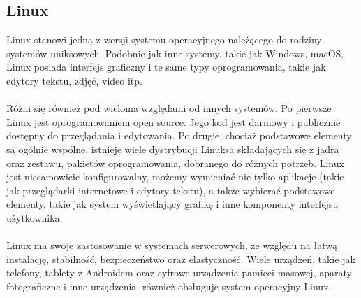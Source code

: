 \documentclass[10pt,a4paper]{report}
\begin{document}
\begin{adjustwidth}{2cm}{2cm}
\section{Linux}
\begin{minipage}{1\linewidth}
Linux stanowi jedną z wersji systemu operacyjnego należącego do rodziny systemów uniksowych.
Podobnie jak inne systemy, takie jak Windows, macOS, Linux posiada interfejs graficzny i te same typy oprogramowania, takie jak edytory tekstu, zdjęć, video itp. \\ \\
Różni się również pod wieloma względami od innych systemów. Po pierwsze Linux jest oprogramowaniem open source. Jego kod jest darmowy i publicznie dostępny do przeglądania i edytowania. Po drugie, chociaż podstawowe elementy są ogólnie wspólne, istnieje wiele dystrybucji Linuksa składających się z jądra oraz zestawu, pakietów oprogramowania, dobranego do różnych potrzeb. Linux jest niesamowicie konfigurowalny, możemy wymieniać nie tylko aplikacje (takie jak przeglądarki internetowe i edytory tekstu), a także wybierać podstawowe elementy, takie jak system wyświetlający grafikę i inne komponenty interfejsu użytkownika. \\ \\
Linux ma swoje zastosowanie w systemach serwerowych, ze względu na łatwą instalację, stabilność, bezpieczeństwo oraz elastyczność. Wiele urządzeń, takie jak telefony, tablety z Androidem oraz cyfrowe urządzenia pamięci masowej, aparaty fotograficzne i inne urządzenia, również obsługuje system operacyjny Linux.
\end{minipage}

\end{adjustwidth}
\end{document}
